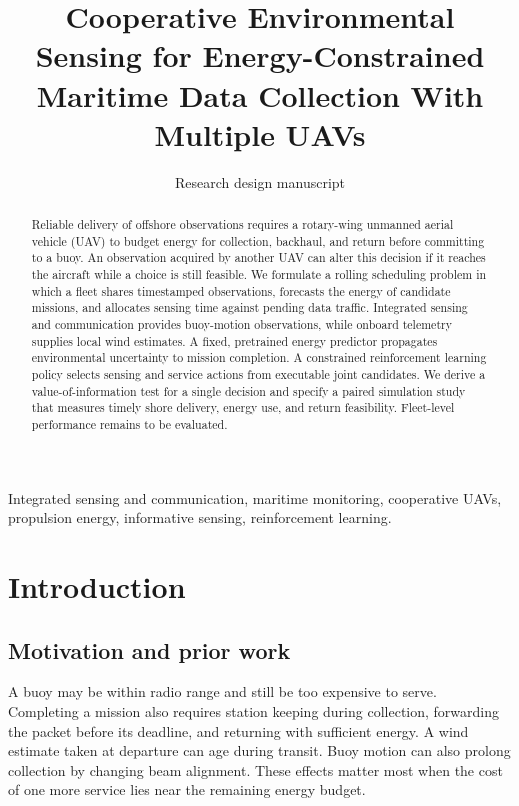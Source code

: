 \documentclass[journal]{IEEEtran}
\begin{document}
\title{Cooperative Environmental Sensing for Energy-Constrained Maritime Data Collection With Multiple UAVs}
\author{Research design manuscript}
\maketitle
\begin{abstract}Reliable delivery of offshore observations requires a rotary-wing unmanned aerial vehicle (UAV) to budget energy for collection, backhaul, and return before committing to a buoy. An observation acquired by another UAV can alter this decision if it reaches the aircraft while a choice is still feasible. We formulate a rolling scheduling problem in which a fleet shares timestamped observations, forecasts the energy of candidate missions, and allocates sensing time against pending data traffic. Integrated sensing and communication provides buoy-motion observations, while onboard telemetry supplies local wind estimates. A fixed, pretrained energy predictor propagates environmental uncertainty to mission completion. A constrained reinforcement learning policy selects sensing and service actions from executable joint candidates. We derive a value-of-information test for a single decision and specify a paired simulation study that measures timely shore delivery, energy use, and return feasibility. Fleet-level performance remains to be evaluated.\end{abstract}
\begin{IEEEkeywords}Integrated sensing and communication, maritime monitoring, cooperative UAVs, propulsion energy, informative sensing, reinforcement learning.\end{IEEEkeywords}
\section{Introduction}
\subsection{Motivation and prior work}
A buoy may be within radio range and still be too expensive to serve. Completing a mission also requires station keeping during collection, forwarding the packet before its deadline, and returning with sufficient energy. A wind estimate taken at departure can age during transit. Buoy motion can also prolong collection by changing beam alignment. These effects matter most when the cost of one more service lies near the remaining energy budget.
\end{document}
